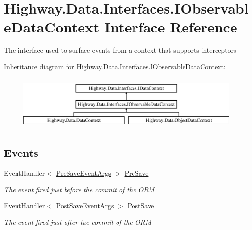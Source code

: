 \hypertarget{interface_highway_1_1_data_1_1_interfaces_1_1_i_observable_data_context}{\section{Highway.\-Data.\-Interfaces.\-I\-Observable\-Data\-Context Interface Reference}
\label{interface_highway_1_1_data_1_1_interfaces_1_1_i_observable_data_context}
}


The interface used to surface events from a context that supports interceptors  


Inheritance diagram for Highway.\-Data.\-Interfaces.\-I\-Observable\-Data\-Context\-:\begin{figure}[H]
\begin{center}
\leavevmode
\includegraphics[height=2.800000cm]{interface_highway_1_1_data_1_1_interfaces_1_1_i_observable_data_context}
\end{center}
\end{figure}
\subsection*{Events}
\begin{DoxyCompactItemize}
\item 
Event\-Handler$<$ \hyperlink{class_highway_1_1_data_1_1_interceptors_1_1_events_1_1_pre_save_event_args}{Pre\-Save\-Event\-Args} $>$ \hyperlink{interface_highway_1_1_data_1_1_interfaces_1_1_i_observable_data_context_add85ecbc05ebf7174003841bdbd72dfe}{Pre\-Save}
\begin{DoxyCompactList}\small\item\em The event fired just before the commit of the O\-R\-M \end{DoxyCompactList}\item 
Event\-Handler$<$ \hyperlink{class_highway_1_1_data_1_1_interceptors_1_1_events_1_1_post_save_event_args}{Post\-Save\-Event\-Args} $>$ \hyperlink{interface_highway_1_1_data_1_1_interfaces_1_1_i_observable_data_context_a1978b914f7b94a37a6e86f3314326ca9}{Post\-Save}
\begin{DoxyCompactList}\small\item\em The event fired just after the commit of the O\-R\-M \end{DoxyCompactList}\end{DoxyCompactItemize}
